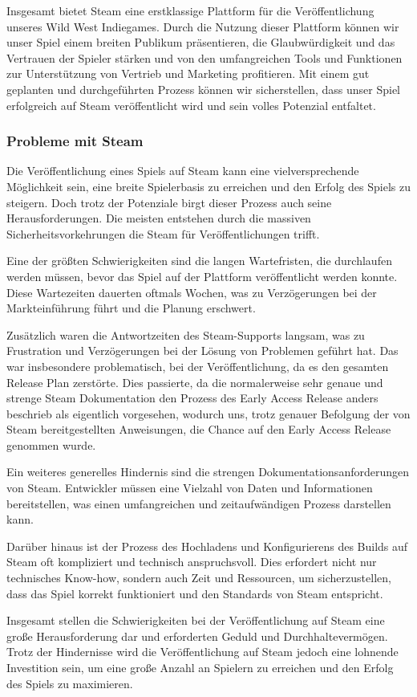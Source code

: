 Insgesamt bietet Steam eine erstklassige Plattform für die Veröffentlichung unseres Wild West Indiegames.
Durch die Nutzung dieser Plattform können wir unser Spiel einem breiten Publikum präsentieren, die Glaubwürdigkeit und das Vertrauen der Spieler stärken und von den umfangreichen Tools und Funktionen zur Unterstützung von Vertrieb und Marketing profitieren.
Mit einem gut geplanten und durchgeführten Prozess können wir sicherstellen, dass unser Spiel erfolgreich auf Steam veröffentlicht wird und sein volles Potenzial entfaltet.

 \subsubsection{Probleme mit Steam}\label{subsubsec:Steam-Herausforderungen}
Die Veröffentlichung eines Spiels auf Steam kann eine vielversprechende Möglichkeit sein, eine breite Spielerbasis zu erreichen und den Erfolg des Spiels zu steigern.
Doch trotz der Potenziale birgt dieser Prozess auch seine Herausforderungen.
Die meisten entstehen durch die massiven Sicherheitsvorkehrungen die Steam für Veröffentlichungen trifft.

Eine der größten Schwierigkeiten sind die langen Wartefristen, die durchlaufen werden müssen, bevor das Spiel auf der Plattform veröffentlicht werden konnte.
Diese Wartezeiten dauerten oftmals Wochen, was zu Verzögerungen bei der Markteinführung führt und die Planung erschwert.

Zusätzlich waren die Antwortzeiten des Steam-Supports langsam, was zu Frustration und Verzögerungen bei der Lösung von Problemen geführt hat.
Das war insbesondere problematisch, bei der Veröffentlichung, da es den gesamten Release Plan zerstörte.
Dies passierte, da die normalerweise sehr genaue und strenge Steam Dokumentation den Prozess des Early Access Release anders beschrieb als eigentlich vorgesehen, wodurch uns, trotz genauer Befolgung der von Steam bereitgestellten Anweisungen, die Chance auf den Early Access Release genommen wurde.

Ein weiteres generelles Hindernis sind die strengen Dokumentationsanforderungen von Steam.
Entwickler müssen eine Vielzahl von Daten und Informationen bereitstellen, was einen umfangreichen und zeitaufwändigen Prozess darstellen kann.

Darüber hinaus ist der Prozess des Hochladens und Konfigurierens des Builds auf Steam oft kompliziert und technisch anspruchsvoll.
Dies erfordert nicht nur technisches Know-how, sondern auch Zeit und Ressourcen, um sicherzustellen, dass das Spiel korrekt funktioniert und den Standards von Steam entspricht.

Insgesamt stellen die Schwierigkeiten bei der Veröffentlichung auf Steam eine große Herausforderung dar und erforderten Geduld und Durchhaltevermögen.
Trotz der Hindernisse wird die Veröffentlichung auf Steam jedoch eine lohnende Investition sein, um eine große Anzahl an Spielern zu erreichen und den Erfolg des Spiels zu maximieren.

\renewcommand{\kapitelautor}{}